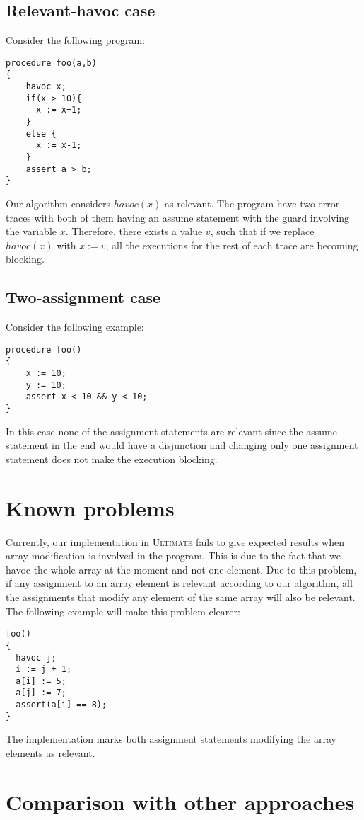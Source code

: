 \documentclass{article}
\newcommand{\ultimate}{\textsc{Ultimate}\xspace} %
\begin{document}
\subsection{Relevant-havoc case}
Consider the following program:
\begin{lstlisting}
procedure foo(a,b)
{
    havoc x;
    if(x > 10){
      x := x+1;
    }
    else {
      x := x-1;
    }
    assert a > b;
}
\end{lstlisting}
Our algorithm considers $havoc(x)$ as relevant. The program have two error traces with both of them having an assume statement with the guard involving the variable $x$. Therefore, there exists a value $v$, such that if we replace $havoc(x)$ with $x:=v$, all the executions for the rest of each trace are becoming blocking. 

\subsection{Two-assignment case}
Consider the following example:
\begin{lstlisting}
procedure foo()
{
    x := 10;
    y := 10;
    assert x < 10 && y < 10;
}
\end{lstlisting}
In this case none of the assignment statements are relevant since the assume statement in the end would have a disjunction and changing only one assignment statement does not make the execution blocking. 
\section{Known problems}
Currently, our implementation in \ultimate fails to give expected results when array modification is involved in the program. This is due to the fact that we havoc the whole array at the moment and not one element. Due to this problem, if any assignment to an array element is relevant according to our algorithm, all the assignments that modify any element of the same array will also be relevant. The following example will make this problem clearer:
\begin{lstlisting}
foo()
{ 
  havoc j;
  i := j + 1;
  a[i] := 5;
  a[j] := 7;
  assert(a[i] == 8);
}
\end{lstlisting}
The implementation marks both assignment statements modifying the array elements as relevant.

\section{Comparison with other approaches}
\end{document}
